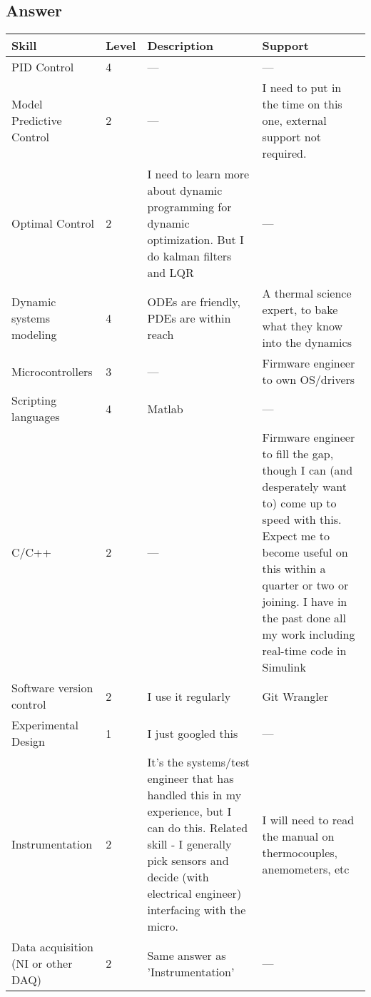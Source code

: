 \documentclass[11pt, oneside]{article}   	%
\begin{document}
\subsection *{Answer}
\begin{center}
\begin{tabularx}{\textwidth}{X l X X}
\hline
	Skill &
	Level & 
	Description & 
	Support 
	\\ [0.5ex] 
\hline\hline
	PID Control & 
	4 & 
	--- & 
	--- \\
\hline
	Model Predictive Control & 
	2 &
	--- & 
	I need to put in the time on this one, external support not required. \\
\hline
	Optimal Control & 
	2 & 
	I need to learn more about dynamic programming for dynamic optimization. But I do kalman filters and LQR & 
	--- \\
\hline
	Dynamic systems modeling & 
	4 & 
	ODEs are friendly, PDEs are within reach & 
	A thermal science expert, to bake what they know into the dynamics \\
\hline
	Microcontrollers & 
	3 & 
	--- & 
	Firmware engineer to own OS/drivers \\
\hline
	Scripting languages & 
	4 & 
	Matlab & 
	--- \\
\hline
	C/C++ & 
	2 & 
	--- & 
	Firmware engineer to fill the gap, though I can (and desperately want to) come up to speed with this. Expect me to 	become useful on this within a quarter or two or joining. I have in the past done all my work including real-time code in Simulink \\
\hline
	Software version control & 
	2 & 
	I use it regularly & 
	Git Wrangler \\
\hline
	Experimental Design & 1 & I just googled this & --- \\
\hline
	Instrumentation & 
	2 & 
	It's the systems/test engineer that has handled this in my experience, but I can do this. Related skill - I generally pick sensors and 		decide (with electrical engineer) interfacing with the micro. & 
	I will need to read the manual on thermocouples, anemometers, etc \\
\hline
	Data acquisition (NI or other DAQ) & 
	2 & 
	Same answer as 'Instrumentation' & 
	--- \\
\hline
\end{tabularx}


\end{center}
\end{document}
